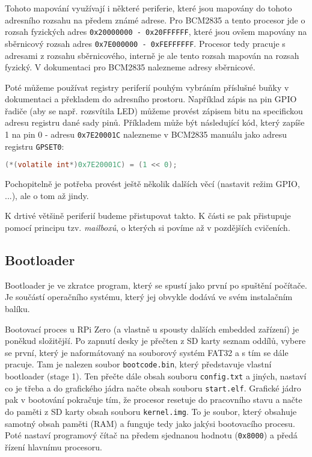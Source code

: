 \documentclass{article}
\begin{document}
Tohoto mapování využívají i některé periferie, které jsou mapovány do tohoto adresního rozsahu na předem známé adrese. Pro BCM2835 a tento procesor jde o rozsah fyzických adres \texttt{0x20000000 - 0x20FFFFFF}, které jsou ovšem mapovány na sběrnicový rozsah adres \texttt{0x7E000000 - 0xFEFFFFFF}. Procesor tedy pracuje s adresami z rozsahu sběrnicového, interně je ale tento rozsah mapován na rozsah fyzický. V dokumentaci pro BCM2835 nalezneme adresy sběrnicové.

Poté můžeme používat registry periferií pouhým vybráním příslušné buňky v dokumentaci a překladem do adresního prostoru. Například zápis na pin GPIO řadiče (aby se např. rozsvítila LED) můžeme provést zápisem bitu na specifickou adresu  registru dané sady pinů. Příkladem může být následující kód, který zapíše 1 na pin 0 - adresu \texttt{0x7E20001C} nalezneme v BCM2835 manuálu jako adresu registru \texttt{GPSET0}:

\begin{lstlisting}[language=C]
(*(volatile int*)0x7E20001C) = (1 << 0);
\end{lstlisting}

Pochopitelně je potřeba provést ještě několik dalších věcí (nastavit režim GPIO, ...), ale o tom až jindy.

K drtivé většině periferií budeme přistupovat takto. K části se pak přistupuje pomocí principu tzv. \emph{mailboxů}, o kterých si povíme až v pozdějších cvičeních.

\subsection{Bootloader}

Bootloader je ve zkratce program, který se spustí jako první po spuštění počítače. Je součástí operačního systému, který jej obvykle dodává ve svém instalačním balíku.

Bootovací proces u RPi Zero (a vlastně u spousty dalších embedded zařízení) je poněkud složitější. Po zapnutí desky je přečten z SD karty seznam oddílů, vybere se první, který je naformátovaný na souborový systém FAT32 a s tím se dále pracuje. Tam je nalezen soubor \texttt{bootcode.bin}, který představuje vlastní bootloader (stage 1). Ten přečte dále obsah souboru \texttt{config.txt} a jiných, nastaví co je třeba a do grafického jádra načte obsah souboru \texttt{start.elf}. Grafické jádro pak v bootování pokračuje tím, že procesor resetuje do pracovního stavu a načte do paměti z SD karty obsah souboru \texttt{kernel.img}. To je soubor, který obsahuje samotný obsah paměti (RAM) a funguje tedy jako jakýsi  bootovacího procesu. Poté nastaví programový čítač na předem sjednanou hodnotu (\texttt{0x8000}) a předá řízení hlavnímu procesoru.
\end{document}
